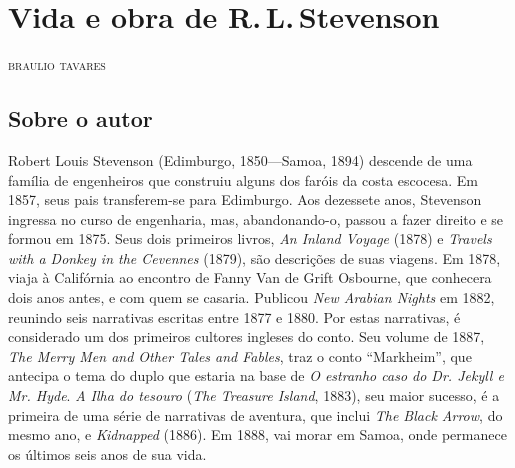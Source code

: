 \chapter{Vida e obra de R.\,L.\,Stevenson}

\begin{flushright}
\textsc{braulio tavares}
\end{flushright}
\bigskip
\section{Sobre o autor}

\noindent{}Robert Louis Stevenson (Edimburgo, 1850---Samoa, 1894) 
descende de uma família de engenheiros que construiu alguns dos 
faróis da costa escocesa. Em 1857, seus pais transferem-se para 
Edimburgo. Aos dezessete anos, Stevenson ingressa no curso de 
engenharia, mas, abandonando-o, passou a fazer direito e se formou em 1875. 
Seus dois primeiros livros, \textit{An Inland Voyage} (1878) e \textit{Travels with a Donkey in the Cevennes} (1879), são descrições de suas viagens. Em 1878, viaja 
à Califórnia ao encontro de Fanny Van de Grift Osbourne, que 
conhecera dois anos antes, e com quem se casaria. Publicou \textit{New 
Arabian Nights} em 1882, reunindo seis narrativas escritas 
entre 1877 e 1880. Por estas narrativas, é considerado um dos 
primeiros cultores ingleses do conto. Seu volume de 1887, 
\textit{The Merry Men and Other Tales and Fables}, traz o conto ``Markheim'', 
que antecipa o tema do duplo que estaria na base de \textit{O estranho caso 
do Dr. Jekyll e Mr. Hyde}. \textit{A Ilha do tesouro} (\textit{The Treasure Island}, 1883), seu maior sucesso, é a primeira de uma série de narrativas 
de aventura, que inclui \textit{The Black Arrow}, do mesmo ano, e \textit{Kidnapped} (1886). Em 1888, vai morar em Samoa, onde permanece os últimos seis anos de sua vida.


